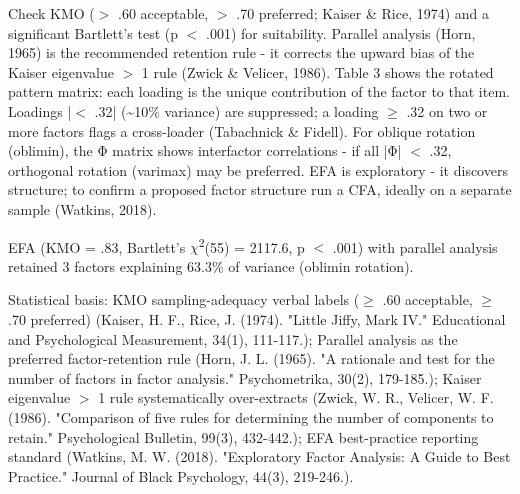 \documentclass{article}
\begin{document}
Check KMO ($>$ .60 acceptable, $>$ .70 preferred; Kaiser \& Rice, 1974) and a significant Bartlett's test (p $<$ .001) for suitability. Parallel analysis (Horn, 1965) is the recommended retention rule - it corrects the upward bias of the Kaiser eigenvalue $>$ 1 rule (Zwick \& Velicer, 1986). Table 3 shows the rotated pattern matrix: each loading is the unique contribution of the factor to that item. Loadings |$<$ .32| (\textasciitilde{}10\% variance) are suppressed; a loading $\ge$ .32 on two or more factors flags a cross-loader (Tabachnick \& Fidell). For oblique rotation (oblimin), the Φ matrix shows interfactor correlations - if all |Φ| $<$ .32, orthogonal rotation (varimax) may be preferred. EFA is exploratory - it discovers structure; to confirm a proposed factor structure run a CFA, ideally on a separate sample (Watkins, 2018).

EFA (KMO = .83, Bartlett's $\chi$\textsuperscript{2}(55) = 2117.6, p $<$ .001) with parallel analysis retained 3 factors explaining 63.3\% of variance (oblimin rotation).

Statistical basis: KMO sampling-adequacy verbal labels ($\ge$ .60 acceptable, $\ge$ .70 preferred) (Kaiser, H. F., Rice, J. (1974). "Little Jiffy, Mark IV." Educational and Psychological Measurement, 34(1), 111-117.); Parallel analysis as the preferred factor-retention rule (Horn, J. L. (1965). "A rationale and test for the number of factors in factor analysis." Psychometrika, 30(2), 179-185.); Kaiser eigenvalue $>$ 1 rule systematically over-extracts (Zwick, W. R., Velicer, W. F. (1986). "Comparison of five rules for determining the number of components to retain." Psychological Bulletin, 99(3), 432-442.); EFA best-practice reporting standard (Watkins, M. W. (2018). "Exploratory Factor Analysis: A Guide to Best Practice." Journal of Black Psychology, 44(3), 219-246.).
\end{document}
